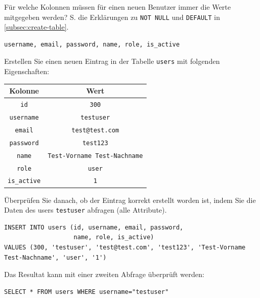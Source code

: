 \begin{myexercise}
\label{aufg:sql-insert}
  Für welche Kolonnen müssen für einen neuen Benutzer immer die Werte mitgegeben werden? S. die Erklärungen zu \lstinline|NOT NULL| und \lstinline|DEFAULT| in \cref{subsec:create-table}.
  \begin{myanswer}
    \begin{verbatim}
username, email, password, name, role, is_active
\end{verbatim}
  \end{myanswer}
\end{myexercise}
\begin{mysubmission}\label{aufg:a-sql-insert}
  Erstellen Sie einen neuen Eintrag in der Tabelle \texttt{users} mit folgenden Eigenschaften:
  \begin{table}[H]
    \centering
    \begin{tabular}{c|c}
      \textbf{Kolonne}    & \textbf{Wert}                       \\\midrule
      \texttt{id}         & \texttt{300}                        \\
      \texttt{username}   & \texttt{testuser}                   \\
      \texttt{email}      & \texttt{test@test.com}              \\
      \texttt{password}   & \texttt{test123}                    \\
      \texttt{name}       & \texttt{Test-Vorname Test-Nachname} \\
      \texttt{role}       & \texttt{user}                       \\
      \texttt{is\_active} & \texttt{1}                          \\
    \end{tabular}
  \end{table}
  Überprüfen Sie danach, ob der Eintrag korrekt erstellt worden ist, indem Sie die Daten des users \texttt{testuser} abfragen (alle Attribute).
  \begin{myanswer}
    \begin{lstlisting}
INSERT INTO users (id, username, email, password, 
				   name, role, is_active) 
VALUES (300, 'testuser', 'test@test.com', 'test123', 'Test-Vorname Test-Nachname', 'user', '1')
\end{lstlisting}
Das Resultat kann mit einer zweiten Abfrage überprüft werden:
\begin{lstlisting}
SELECT * FROM users WHERE username="testuser"
\end{lstlisting}
  \end{myanswer}
\end{mysubmission}

